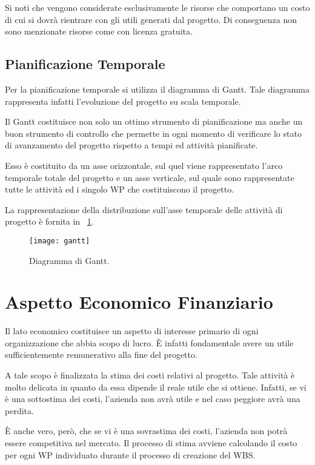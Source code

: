 Si noti che vengono considerate esclusivamente le risorse che comportano un costo di cui si dovrà rientrare con gli utili generati dal progetto. Di conseguenza non sono menzionate risorse come \sw con licenza gratuita.

\subsection{Pianificazione Temporale}
Per la pianificazione temporale si utilizza il diagramma di Gantt. Tale diagramma rappresenta infatti l'evoluzione del progetto su scala temporale.

Il Gantt costituisce non solo un ottimo strumento di pianificazione ma anche un buon strumento di controllo che permette in ogni momento di verificare lo stato di avanzamento del progetto rispetto a tempi ed attività pianificate.

Esso è costituito da un asse orizzontale, sul quel viene rappresentato l'arco temporale totale del progetto e un asse verticale, sul quale sono rappresentate tutte le attività ed i singolo WP che costituiscono il progetto.

La rappresentazione della distribuzione sull'asse temporale delle attività di progetto è fornita in \figurename~\ref{fig:gantt}.

\begin{figure}[H]
  \texttt{[image: gantt]}	
	\caption{Diagramma di Gantt.}
	\label{fig:gantt}
\end{figure}

\section{Aspetto Economico Finanziario}\label{sec:aspettoeconomico}
Il lato economico costituisce un aspetto di interesse primario di ogni organizzazione che abbia scopo di lucro. È infatti fondamentale avere un utile sufficientemente remunerativo alla fine del progetto.

A tale scopo è finalizzata la stima dei costi relativi al progetto. Tale attività è molto delicata in quanto da essa dipende il reale utile che si ottiene. Infatti, se vi è una sottostima dei costi, l'azienda non avrà utile e nel caso peggiore avrà una perdita.

È anche vero, però, che se vi è una sovrastima dei costi, l'azienda non potrà essere competitiva nel mercato. Il processo di stima avviene calcolando il costo per ogni WP individuato durante il processo di creazione del WBS.

